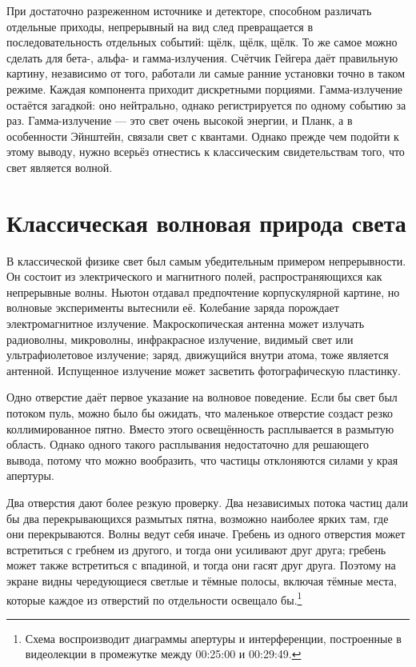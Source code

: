 При достаточно разреженном источнике и детекторе, способном различать отдельные приходы, непрерывный на вид след превращается в последовательность отдельных событий: щёлк, щёлк, щёлк. То же самое можно сделать для бета-, альфа- и гамма-излучения. Счётчик Гейгера даёт правильную картину, независимо от того, работали ли самые ранние установки точно в таком режиме. Каждая компонента приходит дискретными порциями. Гамма-излучение остаётся загадкой: оно нейтрально, однако регистрируется по одному событию за раз. Гамма-излучение — это свет очень высокой энергии, и Планк, а в особенности Эйнштейн, связали свет с квантами. Однако прежде чем подойти к этому выводу, нужно всерьёз отнестись к классическим свидетельствам того, что свет является волной.

\section{Классическая волновая природа света}

В классической физике свет был самым убедительным примером непрерывности. Он состоит из электрического и магнитного полей, распространяющихся как непрерывные волны. Ньютон отдавал предпочтение корпускулярной картине, но волновые эксперименты вытеснили её. Колебание заряда порождает электромагнитное излучение. Макроскопическая антенна может излучать радиоволны, микроволны, инфракрасное излучение, видимый свет или ультрафиолетовое излучение; заряд, движущийся внутри атома, тоже является антенной. Испущенное излучение может засветить фотографическую пластинку.

Одно отверстие даёт первое указание на волновое поведение. Если бы свет был потоком пуль, можно было бы ожидать, что маленькое отверстие создаст резко коллимированное пятно. Вместо этого освещённость расплывается в размытую область. Однако одного такого расплывания недостаточно для решающего вывода, потому что можно вообразить, что частицы отклоняются силами у края апертуры.

Два отверстия дают более резкую проверку. Два независимых потока частиц дали бы два перекрывающихся размытых пятна, возможно наиболее ярких там, где они перекрываются. Волны ведут себя иначе. Гребень из одного отверстия может встретиться с гребнем из другого, и тогда они усиливают друг друга; гребень может также встретиться с впадиной, и тогда они гасят друг друга. Поэтому на экране видны чередующиеся светлые и тёмные полосы, включая тёмные места, которые каждое из отверстий по отдельности освещало бы.\footnote{Схема воспроизводит диаграммы апертуры и интерференции, построенные в видеолекции в промежутке между 00:25:00 и 00:29:49.}

